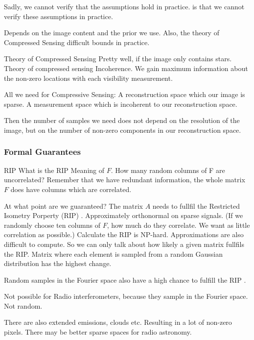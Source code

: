 Sadly, we cannot verify that the assumptions hold in practice. is that we cannot verify these assumptions in practice.


Depends on the image content and the prior we use. Also, the theory of Compressed Sensing difficult bounds in practice.




Theory of Compressed Sensing
Pretty well, if the image only contains stars. Theory of compressed sensing 
Incoherence. We gain maximum information about the non-zero locations with each visibility measurement.

All we need for Compressive Sensing: A reconstruction space which our image is sparse.
A measurement space which is incoherent to our reconstruction space.

Then the number of samples we need does not depend on the resolution of the image, but on the number of non-zero components in our reconstruction space.





\subsubsection{Formal Guarantees}\label{radio:cd:formal}
RIP
What is the RIP
Meaning of $F$. How many random columns of F are uncorrelated? Remember that we have redundant information, the whole matrix $F$ does have columns which are correlated.

At what point are we guaranteed? The matrix $A$ needs to fullfil the Restricted Isometry Porperty (RIP) \cite{candes2006robust,donoho2006compressed}.
Approximately orthonormal on sparse signals. (If we randomly choose ten columns of $F$, how much do they correlate. We want as little correlation as possible.)
Calculate the RIP is NP-hard\cite{tillmann2013computational}. Approximations are also difficult to compute\cite{natarajan2014computational}.
So we can only talk about how likely a given matrix fullfils the RIP. Matrix where each element is sampled from a random Gaussian distributîon has the highest change.

Random samples in the Fourier space also have a high chance to fulfill the RIP \cite{haviv2017restricted}.

Not possible for Radio interferometers, because they sample in the Fourier space. Not random.

There are also extended emissions, clouds etc. Resulting in a lot of non-zero pixels. There may be better sparse spaces for radio astronomy.

